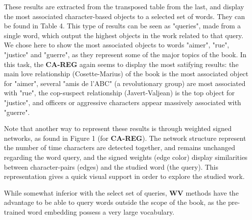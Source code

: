 \documentclass[
twocolumn,
]{ceurart}
\begin{document}
These results are extracted from the transposed table from the last, and display the most associated character-based objects to a selected set of words. They can be found in Table 4. This type of results can be seen as "queries", made from a single word, which output the highest objects in the work related to that query. We chose here to show the most associated objects to words "aimer", "rue", "justice" and "guerre", as they represent some of the major topics of the book. In this task, the \textbf{CA-REG} again seems to display the most satifying results: the main love relationship (Cosette-Marius) of the book is the most associated object for "aimer", several "amis de l'ABC" (a revolutionary group) are most associated with "rue", the cop-suspect relationship (Javert-Valjean) is the top object for "justice", and officers or aggressive characters appear massively associated with "guerre". 

Note that another way to represent these results is through weighted signed networks, as found in Figure 1 (for \textbf{CA-REG}). The network structure represent the number of time characters are detected together, and remains unchanged regarding the word query, and the signed weights (edge color) display similarities between character-pairs (edges) and the studied word (the query). This representation gives a quick visual support in order to explore the studied work.

While somewhat inferior with the select set of queries, \textbf{WV} methods have the advantage to be able to query words outside the scope of the book, as the pre-trained word embedding possess a very large vocabulary. 

\end{document}
